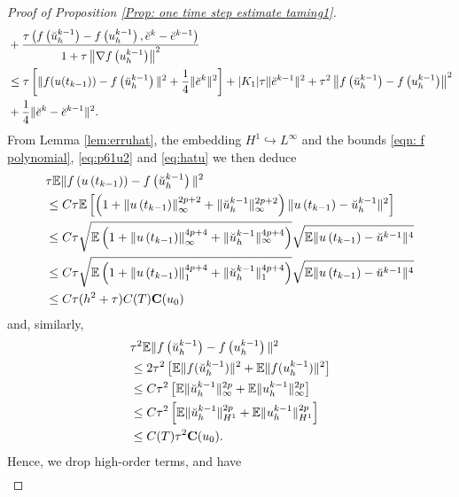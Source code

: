 \documentclass[10pt,a4paper]{amsart}
\newcommand{\con}{\mathbf{C}}
\begin{document}
\begin{proof}[Proof of Proposition \ref{Prop: one time  step estimate taming1}]
\begin{align}
&+\frac{\tau\left(f\left(\breve{u}_h^{k-1}\right)-f\left(u_h^{k-1}\right), \breve{e}^k-\breve{e}^{k-1}\right)}
{1+\tau\left\|\nabla f\left(u_h^{k-1}\right)\right\|^2}\notag\\
& \leq \tau\left[\|f(u(t_{k-1}))-f\left(\breve{u}_h^{k-1}\right)\|^2+\frac{1}{4}\| \breve{e}^k \|^2\right]+ |K_1|\tau\| \breve{e}^{k-1}\|^2+\tau^2\left\| f\left(\breve{u}_h^{k-1}\right)-f\left(u_h^{k-1}\right) \right\|^2 \notag\\
&+\frac{1}{4}\|\breve{e}^k-\breve{e}^{k-1}\|^2 .
\end{align}
From Lemma \ref{lem:erruhat}, the embedding $H^1\hookrightarrow L^\infty$  and the bounds \eqref{eqn: f polynomial}, \eqref{eq:p61u2} and \eqref{eq:hatu} we then deduce
\begin{align}\label{eqn:fuuhat}
& \tau \mathbb{E} \| f\left(u\left(t_{k-1}\right)\right)-f\left(\breve{u}_h^{k-1}\right) \|^2 \\
& \leq C \tau \mathbb{E}\left[\left(1+\left\|u\left(t_{k-1}\right)\right\|_{\infty}^{2p+2}+\|\breve{u}_h^{k-1}\|_{\infty}^{2p+2}\right)\|u\left(t_{k-1}\right)-\breve{u}_h^{k-1}\|^2\right] \notag\\
& \leq C \tau \sqrt{\mathbb{E}\left(1+\left\|u\left(t_{k-1}\right)\right\|_{\infty}^{4p+4}+\|\breve{u}_h^{k-1}\|_{\infty}^{4p+4}\right)}\sqrt{\mathbb{E}\|u\left(t_{k-1}\right)-\breve{u}^{k-1}\|^4}\notag \\
& \leq C \tau \sqrt{\mathbb{E}\left(1+\left\|u\left(t_{k-1}\right)\right\|_{1}^{4p+4}+\|\breve{u}_h^{k-1}\|_{1}^{4p+4}\right)}\sqrt{\mathbb{E}\|u\left(t_{k-1}\right)-\breve{u}^{k-1}\|^4} \notag\\
& \leq C \tau (h^2+\tau) C(T) \con(u_0) 
\end{align}
and, similarly, 
\begin{align}
&\tau^2 \mathbb{E}\|f\left(\breve{u}_h^{k-1}\right)-f\left(u_h^{k-1}\right)\|^2 \notag\\
&\leq 2\tau^2\left[\mathbb{E}\|f(\breve{u}_h^{k-1})\|^2+\mathbb{E}\|f(u_h^{k-1})\|^2\right]\notag\\
&\leq C\tau^2\left[\mathbb{E}\|\breve{u}_h^{k-1}\|_\infty^{2p}+\mathbb{E}\|u_h^{k-1}\|_\infty^{2p}\right]\notag\\
&\leq C\tau^2\left[\mathbb{E}\|\breve{u}_h^{k-1}\|_{{H}^1}^{2p}+\mathbb{E}\|u_h^{k-1}\|_{{H}^1}^{2p}\right]\notag\\
&\leq C(T) \tau^2 \con(u_0).
\end{align}
Hence, we drop high-order terms, and have
\begin{align}\label{eq:estJ}

\end{align}
\end{proof}
\end{document}
